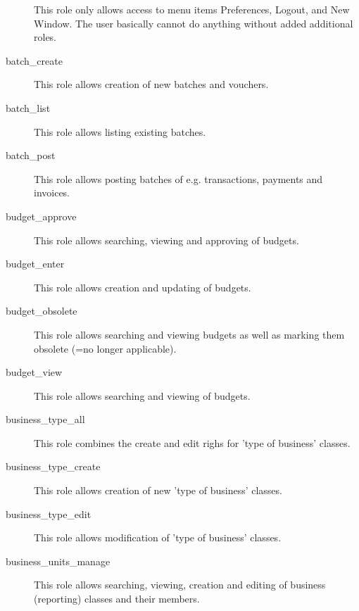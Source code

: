 \begin{description}
  This role only allows access to menu items Preferences, Logout, and New Window. The user basically cannot do anything without added additional roles.
\item [batch\_create] \htmlspacing 
                         This role allows creation of new batches and vouchers.
\item [batch\_list] \htmlspacing 
                         This role allows listing existing batches.
\item [batch\_post] \htmlspacing 
                         This role allows posting batches of e.g. transactions, payments and invoices.
\item [budget\_approve] \htmlspacing 
                         This role allows searching, viewing and approving of budgets.
\item [budget\_enter] \htmlspacing 
                         This role allows creation and updating of budgets.
\item [budget\_obsolete] \htmlspacing 
                         This role allows searching and viewing budgets as well as marking them  obsolete (=no longer applicable).
\item [budget\_view] \htmlspacing 
                         This role allows searching and viewing of budgets.
\item [business\_type\_all] \htmlspacing 
                         This role combines the create and edit righs for
                         'type of business' classes.
\item [business\_type\_create] \htmlspacing 
                         This role allows creation of new 'type of business'
                         classes.
\item [business\_type\_edit] \htmlspacing 
                         This role allows modification of 'type of business'
                         classes.
\item [business\_units\_manage] \htmlspacing 
                         This role allows searching, viewing, creation and editing of business (reporting) classes and their members.

\end{description}
